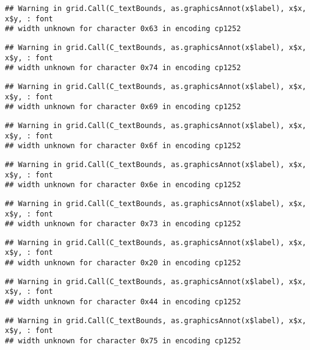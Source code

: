 \documentclass[
]{article}
\begin{document}
\begin{verbatim}
## Warning in grid.Call(C_textBounds, as.graphicsAnnot(x$label), x$x, x$y, : font
## width unknown for character 0x63 in encoding cp1252
\end{verbatim}

\begin{verbatim}
## Warning in grid.Call(C_textBounds, as.graphicsAnnot(x$label), x$x, x$y, : font
## width unknown for character 0x74 in encoding cp1252
\end{verbatim}

\begin{verbatim}
## Warning in grid.Call(C_textBounds, as.graphicsAnnot(x$label), x$x, x$y, : font
## width unknown for character 0x69 in encoding cp1252
\end{verbatim}

\begin{verbatim}
## Warning in grid.Call(C_textBounds, as.graphicsAnnot(x$label), x$x, x$y, : font
## width unknown for character 0x6f in encoding cp1252
\end{verbatim}

\begin{verbatim}
## Warning in grid.Call(C_textBounds, as.graphicsAnnot(x$label), x$x, x$y, : font
## width unknown for character 0x6e in encoding cp1252
\end{verbatim}

\begin{verbatim}
## Warning in grid.Call(C_textBounds, as.graphicsAnnot(x$label), x$x, x$y, : font
## width unknown for character 0x73 in encoding cp1252
\end{verbatim}

\begin{verbatim}
## Warning in grid.Call(C_textBounds, as.graphicsAnnot(x$label), x$x, x$y, : font
## width unknown for character 0x20 in encoding cp1252
\end{verbatim}

\begin{verbatim}
## Warning in grid.Call(C_textBounds, as.graphicsAnnot(x$label), x$x, x$y, : font
## width unknown for character 0x44 in encoding cp1252
\end{verbatim}

\begin{verbatim}
## Warning in grid.Call(C_textBounds, as.graphicsAnnot(x$label), x$x, x$y, : font
## width unknown for character 0x75 in encoding cp1252
\end{verbatim}
\end{document}
